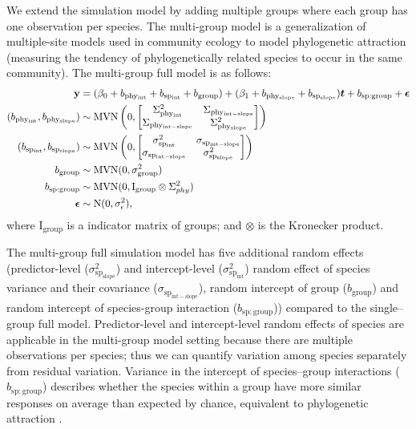 \documentclass[12pt]{article}
\begin{document}
We extend the simulation model by adding multiple groups where each group has one observation per species. 
The multi-group model is a generalization of multiple-site models used in community ecology to model phylogenetic attraction (measuring the tendency of phylogenetically related species to occur in the same community). 
The multi-group full model is as follows: 
\begin{equation}
\begin{aligned}
{\mathbf y} & = (\beta_0 + b_{\mathrm{phy_{int}}} + b_{\mathrm{sp_{int}}} + b_{\mathrm{group}}) + (\beta_1 + b_{\mathrm{phy_{slope}}} + b_{\mathrm{sp_{slope}}}) \bm{t} + b_{\mathrm{sp:group}} + {\boldsymbol \epsilon} \\
(b_{\mathrm{phy_{int}}}, b_{\mathrm{phy_{slope}}}) & \sim \textrm{MVN} \left( 0, \begin{bmatrix}
\Sigma^2_{\mathrm{phy_{int}}} & \Sigma_{\mathrm{phy_{int-slope}}} \\ 
\Sigma_{\mathrm{phy_{int-slope}}} & \Sigma^2_{\mathrm{phy_{slope}}}
\end{bmatrix}
\right) \\
(b_{\mathrm{sp_{int}}}, b_{\mathrm{sp_{slope}}}) & \sim \textrm{MVN} \left( 0, \begin{bmatrix}
\sigma^2_{\mathrm{sp_{int}}} & \sigma_{\mathrm{sp_{int-slope}}} \\ 
\sigma_{\mathrm{sp_{int-slope}}} & \sigma^2_{\mathrm{sp_{slope}}}
\end{bmatrix}
\right) \\
b_{\mathrm{group}} & \sim \textrm{MVN} ( 0 , \sigma^2_{\mathrm{group}}) \\
b_{\mathrm{sp:group}} & \sim \textrm{MVN} (0, \mathrm{I}_{\mathrm{group}} \otimes \Sigma^2_{phy}) \\
{\boldsymbol \epsilon} & \sim \textrm{N} ( 0 , \sigma_{\epsilon}^2),
\label{eq:multiple_glmm}
\end{aligned}
\end{equation}
where $\textrm{I}_{\textrm{group}}$ is a indicator matrix of groups; and $\otimes$ is the Kronecker product.

The multi-group full simulation model has five additional random effects (predictor-level ($\sigma^2_{\mathrm{sp_{slope}}}$) and intercept-level ($\sigma^2_{\mathrm{sp_{int}}}$) random effect of species variance and their covariance ($\sigma_{\mathrm{sp_{int-slope}}}$), random intercept of group ($b_{\mathrm{group}}$) and random intercept of species-group interaction ($b_{\mathrm{sp:group}}$)) compared to the single--group full model.
Predictor-level and intercept-level random effects of species are applicable in the multi-group model setting because there are multiple observations per species; thus we can quantify variation among species separately from residual variation.
Variance in the intercept of species--group interactions ($b_{\mathrm{sp:group}}$) describes whether the species within a group have more similar responses on average than expected by chance, equivalent to phylogenetic attraction \citep{helmus2007separating}. 
\end{document}
